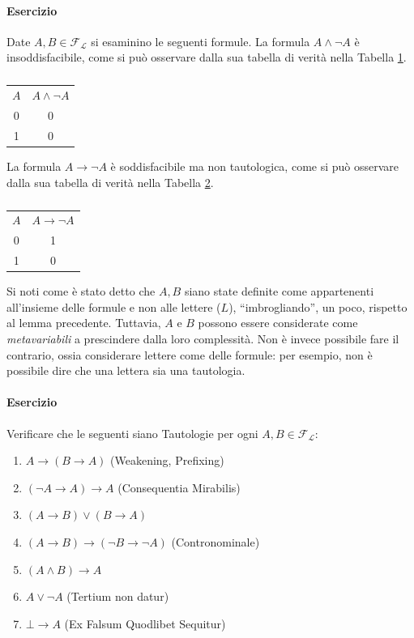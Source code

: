 \paragraph{Esercizio}
Date $A, B \in \mathscr{F_L}$ si esaminino le seguenti formule. 
La formula $A \land \neg A$ è insoddisfacibile, come si può osservare dalla 
sua tabella di verità nella Tabella \ref{table:insodd}.
\begin{table}[!h]
  \centering
  \begin{tabular}{|c|c|}
  \hline
  $A$ & $A \land \neg A$ \\
   0  &   0        \\ 
   1  &  0         \\
   \hline
 \end{tabular}
 \caption{}
 \label{table:insodd}
\end{table}

La formula $A \rightarrow \neg A$ è soddisfacibile ma non tautologica, 
come si può osservare dalla sua tabella di verità nella Tabella \ref{table:sodd}.
\begin{table}[h]
  \centering
  \begin{tabular}{|c|c|}
    \hline 
    $A$ & $A \rightarrow \neg A$\\
     0 &   1 \\
     1 &  0 \\
     \hline
  \end{tabular}
  \caption{}
  \label{table:sodd}
\end{table}

Si noti come è stato detto che $A,B$ siano state definite come appartenenti 
all'insieme delle formule e non alle lettere ($L$), ``imbrogliando'', un poco, 
rispetto al lemma precedente. Tuttavia, $A$ e $B$ possono essere considerate 
come \textit{metavariabili} a prescindere dalla loro complessità. Non è invece 
possibile fare il contrario, ossia considerare lettere come delle formule: 
per esempio, non è possibile dire che una lettera sia una tautologia. 

\paragraph{Esercizio}
Verificare che le seguenti siano Tautologie per ogni $A,B \in \mathscr{F_L}$:
\begin{enumerate}
  \item $A \rightarrow (B \rightarrow A)$ (Weakening, Prefixing)
  \item $(\neg A \rightarrow A) \rightarrow A$ (Consequentia Mirabilis)
  \item $(A \rightarrow B) \lor (B \rightarrow A)$ 
  \item $(A \rightarrow B) \rightarrow (\neg B \rightarrow \neg A)$ (Contronominale)
  \item $(A \land B) \rightarrow A$
  \item $A \lor \neg A$  (Tertium non datur)
  \item $\bot \rightarrow A$ (Ex Falsum Quodlibet Sequitur)
\end{enumerate}

